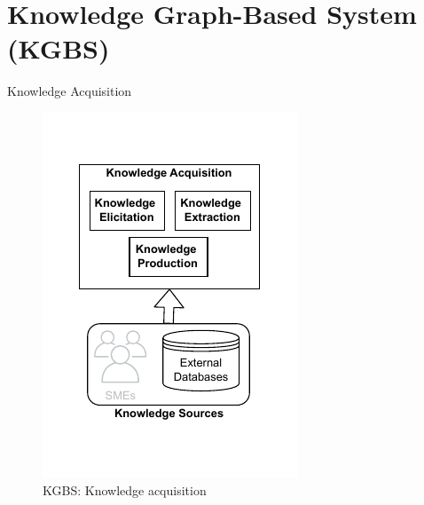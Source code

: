 \section{Knowledge Graph-Based System (KGBS)}

\begin{frame}{Knowledge Acquisition}

    \begin{figure} [H]
        \begin{center}
            \includegraphics[scale=0.8]{images/KGBS-knowledge-acquisition.pdf} 
            \caption{KGBS: Knowledge acquisition} 
        \end{center}
    \end{figure}

\end{frame}

